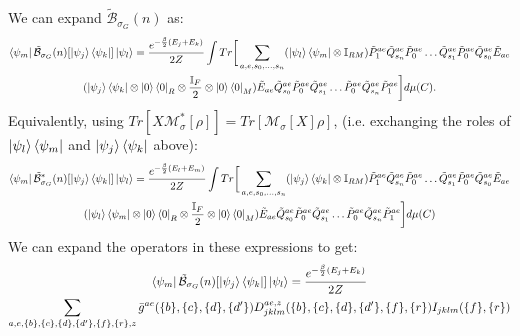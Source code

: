 \documentclass[aps,floatfix,10pt,amssymb,amsfont,amsmath,superscriptaddress,float,nofootinbib,longbibliography,nobalancelastpage,twocolumn]{revtex4-2}
\begin{document}
We can expand $\tilde{\mathcal{B}}_{\sigma_G}(n)$ as:
\begin{multline}
    \bra{\psi_m}\tilde{\mathcal{B}}_{\sigma_G}(n)[\ket{\psi_j}\bra{\psi_k}]\ket{\psi_l} = \frac{e^{-\frac{\beta}{2}(E_j+E_k)}}{2Z}\int Tr\bigg[ \sum_{a,e,s_0,\ldots,s_n}(\ket{\psi_l}\bra{\psi_m}\otimes \mathbb{I}_{RM})\tilde P^{ae}_1\tilde Q^{ae}_{s_n}\tilde P^{ae}_0\ldots\tilde Q^{ae}_{s_1}\tilde P^{ae}_0\tilde Q^{ae}_{s_0}\tilde E_{ae} \\(\ket{\psi_j}\bra{\psi_k}\otimes \ket{0}\bra{0}_R\otimes \frac{\mathbb{I}_F}{2}\otimes \ket{0}\bra{0}_M)  \tilde E_{ae}\tilde Q^{ae}_{s_0}\tilde P^{ae}_0\tilde Q^{ae}_{s_1}\ldots\tilde P^{ae}_0\tilde Q^{ae}_{s_n}\tilde P^{ae}_1\bigg]d\mu(C).
\end{multline}
Equivalently, using $Tr[X\mathcal{M}^*_{\sigma}[\rho]] = Tr[\mathcal{M}_{\sigma}[X]\rho]$, (i.e. exchanging the roles of $\ket{\psi_l}\bra{\psi_m}$ and $\ket{\psi_j}\bra{\psi_k}$ above):
\begin{multline}
       \bra{\psi_m}\tilde{\mathcal{B}}^*_{\sigma_G}(n)[\ket{\psi_j}\bra{\psi_k}]\ket{\psi_l} = \frac{e^{-\frac{\beta}{2}(E_l+E_m)}}{2Z}\int Tr\bigg[ \sum_{a,e,s_0,\ldots,s_n}(\ket{\psi_j}\bra{\psi_k}\otimes \mathbb{I}_{RM})\tilde P^{ae}_1\tilde Q^{ae}_{s_n}\tilde P^{ae}_0\ldots\tilde Q^{ae}_{s_1}\tilde P^{ae}_0\tilde Q^{ae}_{s_0}\tilde E_{ae} \\(\ket{\psi_l}\bra{\psi_m}\otimes \ket{0}\bra{0}_R\otimes \frac{\mathbb{I}_F}{2}\otimes \ket{0}\bra{0}_M)  \tilde E_{ae}\tilde Q^{ae}_{s_0}\tilde P^{ae}_0\tilde Q^{ae}_{s_1}\ldots\tilde P^{ae}_0\tilde Q^{ae}_{s_n}\tilde P^{ae}_1\bigg]d\mu(C)
    \label{eq:Bstarexpanded}
\end{multline}
We can expand the operators in these expressions to get:
\begin{multline}
    \bra{\psi_m}\tilde{\mathcal{B}}_{\sigma_G}(n)[\ket{\psi_j}\bra{\psi_k}]\ket{\psi_l} = \frac{e^{-\frac{\beta}{2}(E_j+E_k)}}{2Z}\\\sum_{a,e,\{b\},\{c\},\{d\},\{d'\},\{f\},\{r\},z} \bar g^{ae}(\{b\},\{c\},\{d\},\{d'\}) D^{ae,z}_{jklm}(\{b\},\{c\},\{d\},\{d'\},\{f\},\{r\})I_{jklm}(\{f\},\{r\})
    \label{eq:def}
\end{multline}
\end{document}

